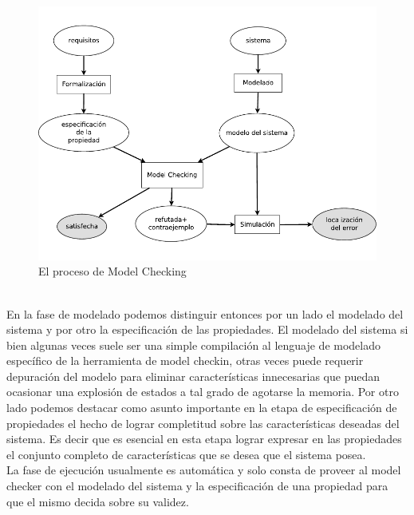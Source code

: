\documentclass[titlepage, 12pt]{book}
\begin{document}
\begin{figure}[H]
  \centering
    \includegraphics{Imagenes/procesoMC4.pdf}
  \caption{El proceso de Model Checking}
  \label{ltsakripke}
\end{figure}
~\\


En la fase de modelado podemos distinguir entonces por un lado el modelado del sistema y por otro la especificación de las propiedades. El modelado del sistema si bien algunas veces suele ser una simple compilación al lenguaje de modelado específico de la herramienta de model checkin, otras veces puede requerir depuración del modelo para eliminar características innecesarias que puedan ocasionar una explosión de estados a tal grado de agotarse la memoria. Por otro lado podemos destacar como asunto importante en la etapa de especificación de propiedades el hecho de lograr completitud sobre las características deseadas del sistema. Es decir que es esencial en esta etapa lograr expresar en las propiedades el conjunto completo de características que se desea que el sistema posea.\\

La fase de ejecución usualmente es automática y solo consta de proveer al model checker con el modelado del sistema y la especificación de una propiedad para que el mismo decida sobre su validez.\\
\end{document}
